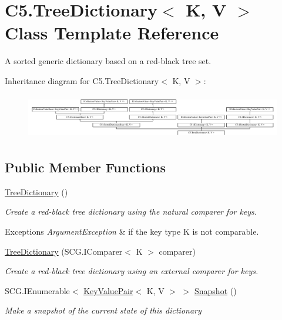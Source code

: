 \hypertarget{class_c5_1_1_tree_dictionary}{}\section{C5.\+Tree\+Dictionary$<$ K, V $>$ Class Template Reference}
\label{class_c5_1_1_tree_dictionary}


A sorted generic dictionary based on a red-\/black tree set.  


Inheritance diagram for C5.\+Tree\+Dictionary$<$ K, V $>$\+:\begin{figure}[H]
\begin{center}
\leavevmode
\includegraphics[height=1.971831cm]{class_c5_1_1_tree_dictionary}
\end{center}
\end{figure}
\subsection*{Public Member Functions}
\begin{DoxyCompactItemize}
\item 
\hyperlink{class_c5_1_1_tree_dictionary_ae75a9bbb0ec94cd5f1c5b16f3c6a7811}{Tree\+Dictionary} ()
\begin{DoxyCompactList}\small\item\em Create a red-\/black tree dictionary using the natural comparer for keys. 
\begin{DoxyExceptions}{Exceptions}
{\em Argument\+Exception} & if the key type K is not comparable. \\
\hline
\end{DoxyExceptions}
\end{DoxyCompactList}\item 
\hyperlink{class_c5_1_1_tree_dictionary_a7ea4cb948694aa5abb7cb780d37b7b3e}{Tree\+Dictionary} (S\+C\+G.\+I\+Comparer$<$ K $>$ comparer)
\begin{DoxyCompactList}\small\item\em Create a red-\/black tree dictionary using an external comparer for keys. \end{DoxyCompactList}\item 
S\+C\+G.\+I\+Enumerable$<$ \hyperlink{struct_c5_1_1_key_value_pair}{Key\+Value\+Pair}$<$ K, V $>$ $>$ \hyperlink{class_c5_1_1_tree_dictionary_ae2032cf1a0cad36fad45f8f073da4f2e}{Snapshot} ()
\begin{DoxyCompactList}\small\item\em Make a snapshot of the current state of this dictionary \end{DoxyCompactList}\end{DoxyCompactItemize}
